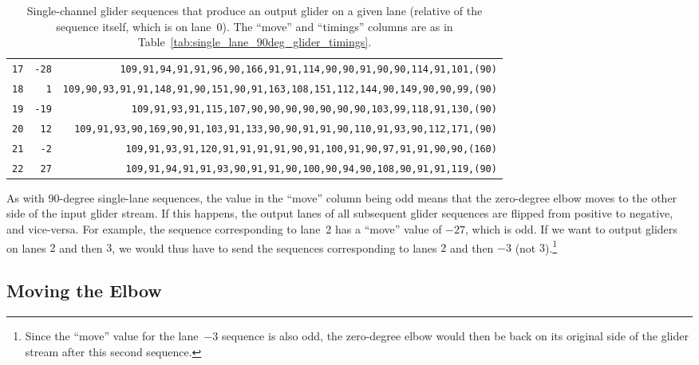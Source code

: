 \begin{table}[!phtb]
\begin{tabular}{@{\hskip 0.31cm}L@{\hskip 0.27cm}r@{\hskip 0.27cm}R@{\hskip 0.34cm}}
		\texttt{17} & \texttt{-28} & \scriptsize\texttt{109,91,94,91,91,96,90,166,91,91,114,90,90,91,90,90,114,91,101,{\color{gray}(90)}} \\
		\texttt{18} & \texttt{1} & \scriptsize\texttt{109,90,93,91,91,148,91,90,151,90,91,163,108,151,112,144,90,149,90,90,99,{\color{gray}(90)}} \\
		\texttt{19} & \texttt{-19} & \scriptsize\texttt{109,91,93,91,115,107,90,90,90,90,90,90,90,103,99,118,91,130,{\color{gray}(90)}} \\
		\texttt{20} & \texttt{12} & \scriptsize\texttt{109,91,93,90,169,90,91,103,91,133,90,90,91,91,90,110,91,93,90,112,171,{\color{gray}(90)}} \\
		\texttt{21} & \texttt{-2} & \scriptsize\texttt{109,91,93,91,120,91,91,91,91,90,91,100,91,90,97,91,91,90,90,{\color{gray}(160)}} \\
		\texttt{22} & \texttt{27} & \scriptsize\texttt{109,91,94,91,91,93,90,91,91,90,100,90,94,90,108,90,91,91,119,{\color{gray}(90)}} \\\bottomrule
	\end{tabular}
	\caption{Single-channel glider sequences that produce an output glider on a given lane (relative of the sequence itself, which is on lane~0). The ``move'' and ``timings'' columns are as in Table~\ref{tab:single_lane_90deg_glider_timings}.}\label{tab:single_lane_0deg_glider_timings}
\end{table}

As with 90-degree single-lane sequences, the value in the ``move'' column being odd means that the zero-degree elbow moves to the other side of the input glider stream. If this happens, the output lanes of all subsequent glider sequences are flipped from positive to negative, and vice-versa. For example, the sequence corresponding to lane~2 has a ``move'' value of $-27$, which is odd. If we want to output gliders on lanes $2$ and then $3$, we would thus have to send the sequences corresponding to lanes $2$ and then $-3$ (not $3$).\footnote{Since the ``move'' value for the lane~$-3$ sequence is also odd, the zero-degree elbow would then be back on its original side of the glider stream after this second sequence.}


\subsection{Moving the Elbow}\label{sec:single_channel_zero_move_elbow}


